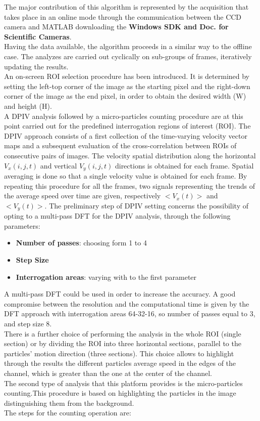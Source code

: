\documentclass[journal]{IEEEtran}
\theoremstyle{definition}
\theoremstyle{remark}
\begin{document}
The major contribution of this algorithm is represented by the acquisition that takes place in an online mode through the communication between the CCD camera and MATLAB downloading the \textbf{Windows SDK and Doc. for Scientific Cameras}.
\\Having the data available, the algorithm proceeds in a similar way to the offline case. The analyzes are carried out cyclically on sub-groups of frames, iteratively updating the results.
\\An on-screen ROI selection procedure has been introduced. It is determined by setting the left-top
corner of the image as the starting pixel and the right-down corner of the image as the end pixel, in order to obtain the desired width (W) and height (H).  
\\A DPIV analysis followed by a micro-particles counting procedure are at this point carried out for the predefined interrogation regions of interest (ROI). The DPIV approach  consists of a first collection of the
time-varying velocity vector maps and a subsequent evaluation of the cross-correlation between ROIs of consecutive pairs of images. The velocity spatial distribution along the horizontal $V_x(i,j,t)$ and vertical $V_y(i,j,t)$ directions is obtained for each frame. Spatial averaging is done so that a single velocity value is obtained for each frame. By repeating this procedure for all the frames, two signals representing the trends of the average speed over time are given, respectively $<V_x(t)>$ and $<V_y(t)>$.
The preliminary step of DPIV setting concerns the possibility of opting to a multi-pass DFT for the DPIV analysis, through the following parameters: 

\begin{itemize}
	\item \textbf{Number of passes}: choosing form 1 to 4
	\item \textbf{Step Size}
	\item \textbf{Interrogation areas}: varying with to the first parameter
\end{itemize}

A multi-pass DFT could be used in order to increase the accuracy. A good compromise between the resolution and the computational time is given by the DFT approach with interrogation areas 64-32-16, so number of passes equal to 3, and step size 8. 
\\There is a further choice of performing the analysis in the whole ROI (single section) or by dividing the ROI into three horizontal sections, parallel to the particles' motion direction (three sections). This choice allows to highlight through the results the different particles average speed in the edges of the channel, which is greater than the one at the center of the channel.
\\The second type of analysis that this platform provides is the micro-particles counting.This procedure is based on highlighting the particles in the image distinguishing them from the background.
 \\The steps for the counting operation are:
 
\end{document}
